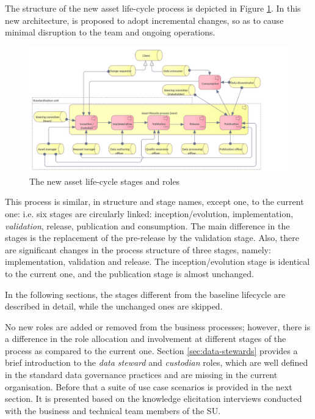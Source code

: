 	The structure of the new asset life-cycle process is depicted in Figure \ref{fig:lifecycle-new}. In this new architecture, is proposed to adopt incremental changes, so as to cause minimal disruption to the team and ongoing operations.

	\begin{figure}[h]
		\centering
		\includegraphics[width=1.05\textwidth]{images/business/Lifecycle (new).png}
		\caption{The new asset life-cycle stages and roles}
		\label{fig:lifecycle-new}
	\end{figure}
	
	This process is similar, in structure and stage names, except one, to the current one: i.e. six stages are circularly linked: inception/evolution, implementation, \textit{validation}, release, publication and consumption. The main difference in the stages is the replacement of the pre-release by the validation stage. Also, there are significant changes in the process structure of three stages, namely: implementation, validation and release. The inception/evolution stage is identical to the current one, and the publication stage is almost unchanged. 
	
	In the following sections, the stages different from the baseline lifecycle are described in detail, while the unchanged ones are skipped.
		
	No new roles are added or removed from the business processes; however, there is a difference in the role allocation and involvement at different stages of the process as compared to the current one. Section \ref{sec:data-stewards} provides a brief introduction to the \textit{data steward} and \textit{custodian} roles, which are well defined in the standard data governance practices and are missing in the current organisation. Before that a suite of use case scenarios is provided in the next section. It is presented based on the knowledge elicitation interviews conducted with the business and technical team members of the SU. 

